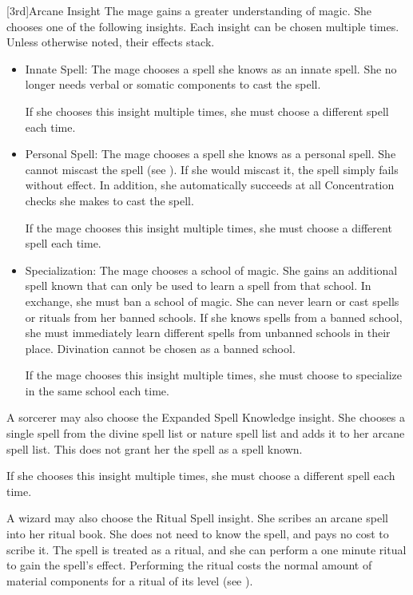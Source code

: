         [3rd]{Arcane Insight}\label{Arcane Insight}
        The mage gains a greater understanding of magic.
        She chooses one of the following insights.
        Each insight can be chosen multiple times.
        Unless otherwise noted, their effects stack.
        \begin{itemize}
            \item Innate Spell: The mage chooses a spell she knows as an innate spell.
                She no longer needs verbal or somatic components to cast the spell.
                \par If she chooses this insight multiple times, she must choose a different spell each time.
            \item Personal Spell: The mage chooses a spell she knows as a personal spell.
                She cannot miscast the spell (see ).
                If she would miscast it, the spell simply fails without effect.
                In addition, she automatically succeeds at all Concentration checks she makes to cast the spell.
                \par If the mage chooses this insight multiple times, she must choose a different spell each time.
            \item Specialization: The mage chooses a school of magic.
                She gains an additional spell known that can only be used to learn a spell from that school.
                In exchange, she must ban a school of magic.
                She can never learn or cast spells or rituals from her banned schools.
                If she knows spells from a banned school, she must immediately learn different spells from unbanned schools in their place.
                Divination cannot be chosen as a banned school.
                \par If the mage chooses this insight multiple times, she must choose to specialize in the same school each time.
        \end{itemize}

         A sorcerer may also choose the Expanded Spell Knowledge insight.
        She chooses a single spell from the divine spell list or nature spell list and adds it to her arcane spell list.
        This does not grant her the spell as a spell known.
        \par If she chooses this insight multiple times, she must choose a different spell each time.

         A wizard may also choose the Ritual Spell insight.
        She scribes an arcane spell into her ritual book.
        She does not need to know the spell, and pays no cost to scribe it.
        The spell is treated as a ritual, and she can perform a one minute ritual to gain the spell's effect.
        Performing the ritual costs the normal amount of material components for a ritual of its level (see ).


